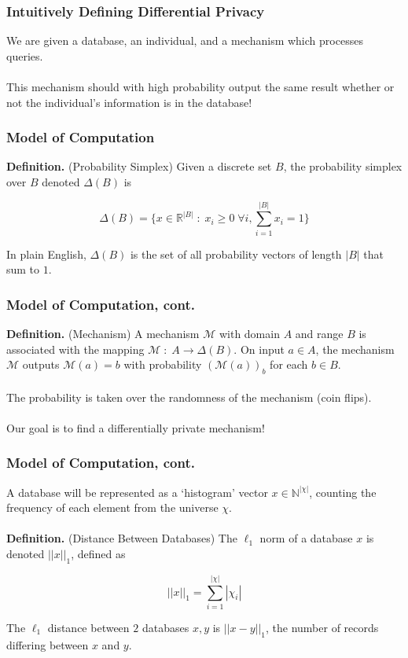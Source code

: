 \documentclass[aspectratio=169]{beamer}
\newcommand{\emm}{\mathcal{M}}
\newcommand{\dbd}{\mathbb{N}^{|\chi|}}
\begin{document}
\begin{frame}
\frametitle{Intuitively Defining Differential Privacy}

We are given a database, an individual, and a mechanism which processes queries.\\~\\

This mechanism should with high probability output the same result whether or not the individual's information is in the database!
\end{frame}

\begin{frame}
\frametitle{Model of Computation}

\textbf{Definition.} (Probability Simplex) Given a discrete set $B$, the probability simplex over $B$ denoted $\Delta(B)$ is

$$\Delta(B) = \bigg\{ x \in \mathbb{R}^{|B|}\;:\; x_i \geq 0\;\forall i, \sum_{i=1}^{|B|} x_i = 1\bigg\}$$

In plain English, $\Delta(B)$ is the set of all probability vectors of length $|B|$ that sum to $1$.
\end{frame}

\begin{frame}
\frametitle{Model of Computation, cont.}

\textbf{Definition.} (Mechanism) A mechanism $\emm$ with domain $A$ and range $B$ is associated with the mapping $\emm\;:\;A \rightarrow \Delta(B)$. On input $a \in A$, the mechanism $\emm$ outputs $\emm(a) = b$ with probability $(\emm(a))_b$ for each $b \in B$.\\~\\

The probability is taken over the randomness of the mechanism (coin flips).\\~\\

Our goal is to find a differentially private mechanism!

\end{frame}

\begin{frame}
\frametitle{Model of Computation, cont.}

A database will be represented as a `histogram' vector $x \in \dbd$, counting the frequency of each element from the universe $\chi$.\\~\\

\textbf{Definition.} (Distance Between Databases) The $\ell_1$ norm of a database $x$ is denoted $||x||_1$, defined as

$$||x||_1 = \sum_{i=1}^{|\chi|} |\chi_i|$$

The $\ell_1$ distance between $2$ databases $x, y$ is $||x-y||_1$, the number of records differing between $x$ and $y$.
\end{frame}
\end{document}
